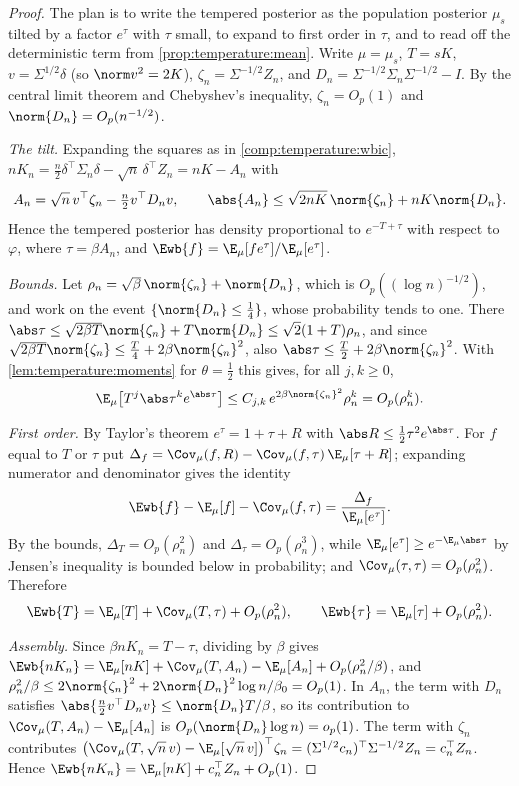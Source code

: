 \begin{refsection}
\begin{proof}
The plan is to write the tempered posterior as the population posterior $\mu_s$ tilted by a factor $e^\tau$ with $\tau$ small, to expand to first order in $\tau$, and to read off the deterministic term from \cref{prop:temperature:mean}. Write $\mu=\mu_s$, $T=sK$, $v=\Sigma^{1/2}\delta$ (so $\norm v^2=2K$), $\zeta_n=\Sigma^{-1/2}Z_n$, and $D_n=\Sigma^{-1/2}\Sigma_n\Sigma^{-1/2}-I$. By the central limit theorem and Chebyshev's inequality, $\zeta_n=O_p(1)$ and $\norm{D_n}=O_p(n^{-1/2})$.

\emph{The tilt.} Expanding the squares as in \cref{comp:temperature:wbic}, $nK_n=\frac n2\delta^\top\Sigma_n\delta-\sqrt n\,\delta^\top Z_n=nK-A_n$ with
\[
A_n=\sqrt n\,v^\top\zeta_n-\tfrac n2v^\top D_nv,\qquad\abs{A_n}\le\sqrt{2nK}\,\norm{\zeta_n}+nK\norm{D_n}.
\]
Hence the tempered posterior has density proportional to $e^{-T+\tau}$ with respect to $\varphi$, where $\tau=\beta A_n$, and $\Ewb{f}=\E_\mu[fe^\tau]/\E_\mu[e^\tau]$.

\emph{Bounds.} Let $\rho_n=\sqrt\beta\,\norm{\zeta_n}+\norm{D_n}$, which is $O_p((\log n)^{-1/2})$, and work on the event $\{\norm{D_n}\le\frac14\}$, whose probability tends to one. There $\abs\tau\le\sqrt{2\beta T}\norm{\zeta_n}+T\norm{D_n}\le\sqrt2(1+T)\rho_n$, and since $\sqrt{2\beta T}\norm{\zeta_n}\le\frac T4+2\beta\norm{\zeta_n}^2$, also $\abs\tau\le\frac T2+2\beta\norm{\zeta_n}^2$. With \cref{lem:temperature:moments} for $\theta=\frac12$ this gives, for all $j,k\ge0$,
\[
\E_\mu\bigl[T^j\abs\tau^ke^{\abs\tau}\bigr]\le C_{j,k}\,e^{2\beta\norm{\zeta_n}^2}\rho_n^k=O_p(\rho_n^k).
\]

\emph{First order.} By Taylor's theorem $e^\tau=1+\tau+R$ with $\abs R\le\frac12\tau^2e^{\abs\tau}$. For $f$ equal to $T$ or $\tau$ put $\Delta_f=\Cov_\mu(f,R)-\Cov_\mu(f,\tau)\,\E_\mu[\tau+R]$; expanding numerator and denominator gives the identity
\[
\Ewb{f}-\E_\mu[f]-\Cov_\mu(f,\tau)=\frac{\Delta_f}{\E_\mu[e^\tau]}.
\]
By the bounds, $\Delta_T=O_p(\rho_n^2)$ and $\Delta_\tau=O_p(\rho_n^3)$, while $\E_\mu[e^\tau]\ge e^{-\E_\mu\abs\tau}$ by Jensen's inequality is bounded below in probability; and $\Cov_\mu(\tau,\tau)=O_p(\rho_n^2)$. Therefore
\[
\Ewb{T}=\E_\mu[T]+\Cov_\mu(T,\tau)+O_p(\rho_n^2),\qquad\Ewb{\tau}=\E_\mu[\tau]+O_p(\rho_n^2).
\]

\emph{Assembly.} Since $\beta nK_n=T-\tau$, dividing by $\beta$ gives $\Ewb{nK_n}=\E_\mu[nK]+\Cov_\mu(T,A_n)-\E_\mu[A_n]+O_p(\rho_n^2/\beta)$, and $\rho_n^2/\beta\le2\norm{\zeta_n}^2+2\norm{D_n}^2\log n/\beta_0=O_p(1)$. In $A_n$, the term with $D_n$ satisfies $\abs{\frac n2v^\top D_nv}\le\norm{D_n}T/\beta$, so its contribution to $\Cov_\mu(T,A_n)-\E_\mu[A_n]$ is $O_p(\norm{D_n}\log n)=o_p(1)$. The term with $\zeta_n$ contributes $\bigl(\Cov_\mu(T,\sqrt n\,v)-\E_\mu[\sqrt n\,v]\bigr)^\top\zeta_n=(\Sigma^{1/2}c_n)^\top\Sigma^{-1/2}Z_n=c_n^\top Z_n$. Hence $\Ewb{nK_n}=\E_\mu[nK]+c_n^\top Z_n+O_p(1)$.


\end{proof}
\end{refsection}
